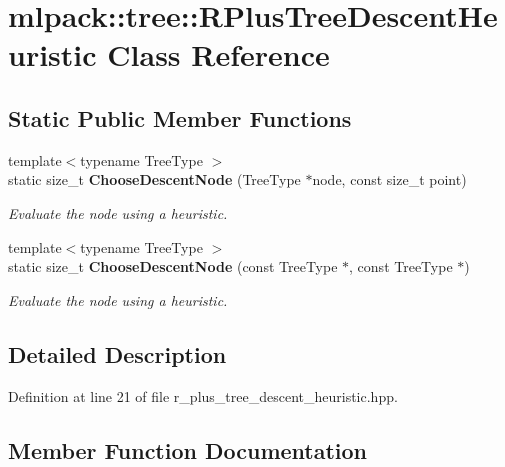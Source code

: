 \section{mlpack\+:\+:tree\+:\+:R\+Plus\+Tree\+Descent\+Heuristic Class Reference}
\label{classmlpack_1_1tree_1_1RPlusTreeDescentHeuristic}
\subsection*{Static Public Member Functions}
\begin{DoxyCompactItemize}
\item 
{\footnotesize template$<$typename Tree\+Type $>$ }\\static size\+\_\+t {\bf Choose\+Descent\+Node} (Tree\+Type $\ast$node, const size\+\_\+t point)
\begin{DoxyCompactList}\small\item\em Evaluate the node using a heuristic. \end{DoxyCompactList}\item 
{\footnotesize template$<$typename Tree\+Type $>$ }\\static size\+\_\+t {\bf Choose\+Descent\+Node} (const Tree\+Type $\ast$, const Tree\+Type $\ast$)
\begin{DoxyCompactList}\small\item\em Evaluate the node using a heuristic. \end{DoxyCompactList}\end{DoxyCompactItemize}


\subsection{Detailed Description}


Definition at line 21 of file r\+\_\+plus\+\_\+tree\+\_\+descent\+\_\+heuristic.\+hpp.



\subsection{Member Function Documentation}
